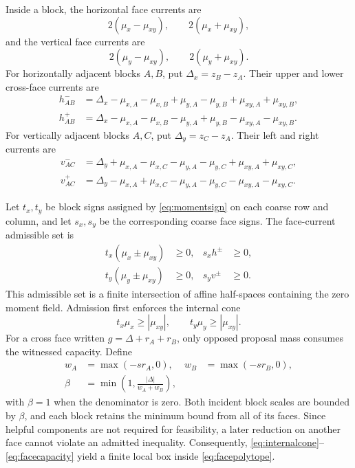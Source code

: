 \documentclass[journal]{IEEEtran}
\begin{document}
Inside a block, the horizontal face currents are
\begin{equation}
 2(\mu_x-\mu_{xy}),\qquad2(\mu_x+\mu_{xy}),
 \label{eq:internalhorizontal}
\end{equation}
and the vertical face currents are
\begin{equation}
 2(\mu_y-\mu_{xy}),\qquad2(\mu_y+\mu_{xy}).
 \label{eq:internalvertical}
\end{equation}
For horizontally adjacent blocks \(A,B\), put \(\Delta_x=z_B-z_A\). Their
upper and lower cross-face currents are
\begin{align}
 h^-_{AB}&=\Delta_x-\mu_{x,A}-\mu_{x,B}
 +\mu_{y,A}-\mu_{y,B}+\mu_{xy,A}+\mu_{xy,B},\nonumber\\
 h^+_{AB}&=\Delta_x-\mu_{x,A}-\mu_{x,B}
 -\mu_{y,A}+\mu_{y,B}-\mu_{xy,A}-\mu_{xy,B}.
 \label{eq:horizontalfaces}
\end{align}
For vertically adjacent blocks \(A,C\), put \(\Delta_y=z_C-z_A\). Their
left and right currents are
\begin{align}
 v^-_{AC}&=\Delta_y+\mu_{x,A}-\mu_{x,C}
 -\mu_{y,A}-\mu_{y,C}+\mu_{xy,A}+\mu_{xy,C},\nonumber\\
 v^+_{AC}&=\Delta_y-\mu_{x,A}+\mu_{x,C}
 -\mu_{y,A}-\mu_{y,C}-\mu_{xy,A}-\mu_{xy,C}.
 \label{eq:verticalfaces}
\end{align}

Let \(t_x,t_y\) be block signs assigned by \eqref{eq:momentsign} on each
coarse row and column, and let \(s_x,s_y\) be the corresponding coarse face
signs. The face-current admissible set is
\begin{equation}
\begin{aligned}
 t_x(\mu_x\pm\mu_{xy})&\geq0,&s_xh^\pm&\geq0,\\
 t_y(\mu_y\pm\mu_{xy})&\geq0,&s_yv^\pm&\geq0.
\end{aligned}
 \label{eq:facepolytope}
\end{equation}
This admissible set is a finite intersection of affine half-spaces containing
the zero moment field. Admission first enforces the internal cone
\begin{equation}
 t_x\mu_x\geq|\mu_{xy}|,\qquad
 t_y\mu_y\geq|\mu_{xy}|.
 \label{eq:internalcone}
\end{equation}
For a cross face written \(g=\Delta+r_A+r_B\), only opposed proposal mass
consumes the witnessed capacity. Define
\begin{align}
 w_A&=\max(-sr_A,0),&w_B&=\max(-sr_B,0),\nonumber\\
 \beta&=\min\left(1,\frac{|\Delta|}{w_A+w_B}\right),
 \label{eq:facecapacity}
\end{align}
with \(\beta=1\) when the denominator is zero. Both incident block scales are
bounded by \(\beta\), and each block retains the minimum bound from all of its
faces. Since helpful components are not required for feasibility, a later
reduction on another face cannot violate an admitted inequality.
Consequently, \eqref{eq:internalcone}--\eqref{eq:facecapacity} yield a finite
local box inside \eqref{eq:facepolytope}.
\end{document}
